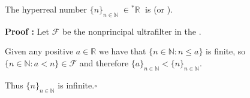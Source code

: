 \documentclass[12pt]{article}
\begin{document}
The hyperreal number $\{n\}_{n \in \mathbb{N}}\; \in {}^*\mathbb{R}\;$ is  (or ).

{\bf Proof :} Let $\mathcal{F}$ be the nonprincipal ultrafilter  in the  .

Given any positive $a \in \mathbb{R}$ we have that $\{n \in \mathbb{N} : n \leq a\}$ is finite, 
so $\{n \in \mathbb{N} : a < n\} \in \mathcal{F}$ and therefore $\{a\}_{n \in \mathbb{N}} < \{n\}_{n \in \mathbb{N}}$.

Thus  $\{n\}_{n \in \mathbb{N}}$ is infinite.$\square$

\end{document}
